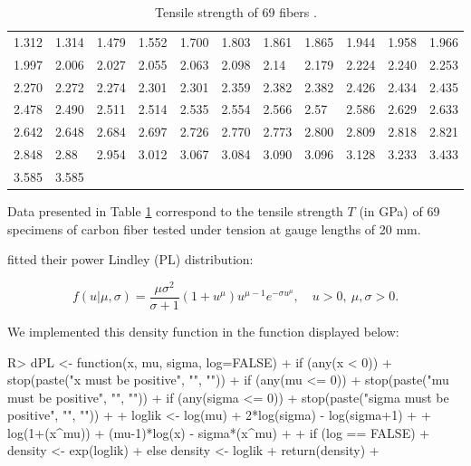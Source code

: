 \documentclass[nojss]{jss}
\begin{document}
\begin{table}[H]
\centering
\begin{tabular}{lllllllllll}
      &       &       &       &       &       &       &       &       &       &       \\ \hline
1.312 & 1.314 & 1.479 & 1.552 & 1.700 & 1.803 & 1.861 & 1.865 & 1.944 & 1.958 & 1.966 \\
1.997 & 2.006 & 2.027 & 2.055 & 2.063 & 2.098 & 2.14  & 2.179 & 2.224 & 2.240 & 2.253 \\
2.270 & 2.272 & 2.274 & 2.301 & 2.301 & 2.359 & 2.382 & 2.382 & 2.426 & 2.434 & 2.435 \\
2.478 & 2.490 & 2.511 & 2.514 & 2.535 & 2.554 & 2.566 & 2.57  & 2.586 & 2.629 & 2.633 \\
2.642 & 2.648 & 2.684 & 2.697 & 2.726 & 2.770 & 2.773 & 2.800 & 2.809 & 2.818 & 2.821 \\
2.848 & 2.88  & 2.954 & 3.012 & 3.067 & 3.084 & 3.090 & 3.096 & 3.128 & 3.233 & 3.433 \\
3.585 & 3.585 &       &       &       &       &       &       &       &       &       \\ \hline
\end{tabular}
\caption{\label{tab:PLdata}Tensile strength of 69 fibers \citep{Devendra2013}.}
\end{table}

Data presented in Table \ref{tab:PLdata} correspond to the tensile strength $T$ (in GPa) of 69 specimens of carbon fiber tested under tension at gauge lengths of 20 mm.

\cite{Ghitany2013} fitted their power Lindley (PL) distribution:

\begin{equation}
f(u|\mu,\sigma) = \frac{\mu \sigma^2}{\sigma + 1} (1 + u^\mu) u ^ {\mu - 1} e^{-\sigma u ^\mu}, \quad u>0, \: \mu, \sigma>0.
\end{equation}

We implemented this density function in the  function  displayed below:

\begin{Schunk}
\begin{Sinput}
R> dPL <- function(x, mu, sigma, log=FALSE){
+    if (any(x < 0))
+      stop(paste("x must be positive", "\n", ""))
+    if (any(mu <= 0))
+      stop(paste("mu must be positive", "\n", ""))
+    if (any(sigma <= 0))
+      stop(paste("sigma must be positive", "\n", ""))
+  
+    loglik <- log(mu) + 2*log(sigma) - log(sigma+1) +
+      log(1+(x^mu)) + (mu-1)*log(x) - sigma*(x^mu)
+  
+    if (log == FALSE)
+      density <- exp(loglik)
+    else density <- loglik
+    return(density)
+  }
\end{Sinput}
\end{Schunk}
\end{document}
